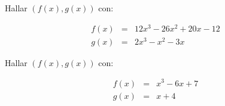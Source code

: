         \begin{ejercicio}
            Hallar $(f(x), g(x))$ con:

            \begin{eqnarray*}
                f(x) & = & 12 x^3 - 26 x^2 + 20 x - 12 \\
                g(x) & = & 2 x^3 - x^2 - 3 x
            \end{eqnarray*}
        \end{ejercicio}

        \begin{ejercicio}
            Hallar $(f(x), g(x))$ con:

            \begin{eqnarray*}
                f(x) & = & x^3 - 6 x + 7 \\
                g(x) & = & x + 4
            \end{eqnarray*}
        \end{ejercicio}
